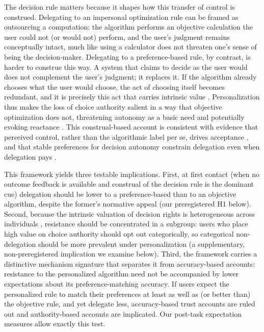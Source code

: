\documentclass[a4paper, 12pt, fleqn]{article}
\theoremstyle{definition}
\begin{document}
The decision rule matters because it shapes how this transfer of control is construed. Delegating to an impersonal optimization rule can be framed as outsourcing a computation: the algorithm performs an objective calculation the user could not (or would not) perform, and the user's judgment remains conceptually intact, much like using a calculator does not threaten one's sense of being the decision-maker. Delegating to a preference-based rule, by contrast, is harder to construe this way. A system that claims to decide as the user would does not complement the user's judgment; it replaces it. If the algorithm already chooses what the user would choose, the act of choosing itself becomes redundant, and it is precisely this act that carries intrinsic value \citep{Bartling2014,Owens2014}. Personalization thus makes the loss of choice authority salient in a way that objective optimization does not, threatening autonomy as a basic need \citep{DeciRyan2000} and potentially evoking reactance \citep{Brehm1966}. This construal-based account is consistent with evidence that perceived control, rather than the algorithmic label per se, drives acceptance \citep{Schaap2024}, and that stable preferences for decision autonomy constrain delegation even when delegation pays \citep{Ivanova-Stenzel2025}.

This framework yields three testable implications. First, at first contact (when no outcome feedback is available and construal of the decision rule is the dominant cue) delegation should be lower to a preference-based than to an objective algorithm, despite the former's normative appeal (our preregistered H1 below). Second, because the intrinsic valuation of decision rights is heterogeneous across individuals \citep{Bartling2014,Owens2014}, resistance should be concentrated in a subgroup: users who place high value on choice authority should opt out categorically, so categorical non-delegation should be more prevalent under personalization (a supplementary, non-preregistered implication we examine below). Third, the framework carries a distinctive mechanism signature that separates it from accuracy-based accounts: resistance to the personalized algorithm need not be accompanied by lower expectations about its preference-matching accuracy. If users expect the personalized rule to match their preferences at least as well as (or better than) the objective rule, and yet delegate less, accuracy-based trust accounts are ruled out and authority-based accounts are implicated. Our post-task expectation measures allow exactly this test.
\end{document}
